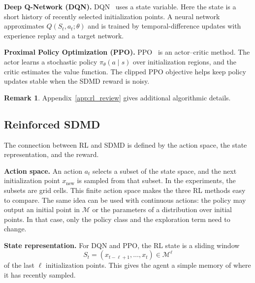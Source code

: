 \documentclass{article}
\numberwithin{equation}{section}
\theoremstyle{definition}
\newtheorem{remark}[theorem]{Remark}
\newcommand{\new}{\text{new}}
\begin{document}
\textbf{Deep Q-Network (DQN).}
DQN~\cite{mnih2013playing} uses a state variable. Here the state is a short history of recently selected initialization points. A neural network approximates $Q(S_t,a_t;\theta)$ and is trained by temporal-difference updates with experience replay and a target network.

\textbf{Proximal Policy Optimization (PPO).}
PPO~\cite{schulman2017proximal} is an actor--critic method. The actor learns a stochastic policy $\pi_\theta(a\mid s)$ over initialization regions, and the critic estimates the value function. The clipped PPO objective helps keep policy updates stable when the SDMD reward is noisy.

\begin{remark}
    Appendix~\ref{app:rl_review} gives additional algorithmic details.
\end{remark}

\subsection{Reinforced SDMD}
The connection between RL and SDMD is defined by the action space, the state representation, and the reward.

\textbf{Action space.}
An action $a_t$ selects a subset of the state space, and the next initialization point $x_{\new}$ is sampled from that subset. In the experiments, the subsets are grid cells. This finite action space makes the three RL methods easy to compare. The same idea can be used with continuous actions: the policy may output an initial point in $\mathcal{M}$ or the parameters of a distribution over initial points. In that case, only the policy class and the exploration term need to change.

\textbf{State representation.}
For DQN and PPO, the RL state is a sliding window
\[
    S_t=(x_{t-\ell+1},\ldots,x_t)\in\mathcal{M}^{\ell}
\]
of the last $\ell$ initialization points. This gives the agent a simple memory of where it has recently sampled.
\end{document}
